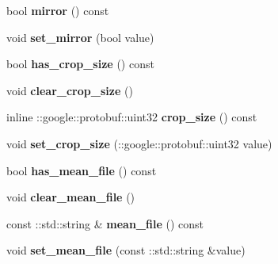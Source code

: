 \begin{DoxyCompactItemize}
bool {\bfseries mirror} () const
\item 
\mbox{\label{classcaffe_1_1_transformation_parameter_a0e266ff7468b2b0ba4c8918617aa4df3}} 
void {\bfseries set\+\_\+mirror} (bool value)
\item 
\mbox{\label{classcaffe_1_1_transformation_parameter_a4119a83b2ae58b89b0b64df912d06693}} 
bool {\bfseries has\+\_\+crop\+\_\+size} () const
\item 
\mbox{\label{classcaffe_1_1_transformation_parameter_a00bbae6421b94a8da3ab51d805ad36c5}} 
void {\bfseries clear\+\_\+crop\+\_\+size} ()
\item 
\mbox{\label{classcaffe_1_1_transformation_parameter_a24d1dc64dfd6da37bf683ab305f97014}} 
inline \+::google\+::protobuf\+::uint32 {\bfseries crop\+\_\+size} () const
\item 
\mbox{\label{classcaffe_1_1_transformation_parameter_af0dbaab7996f1942664bad0330931c8c}} 
void {\bfseries set\+\_\+crop\+\_\+size} (\+::google\+::protobuf\+::uint32 value)
\item 
\mbox{\label{classcaffe_1_1_transformation_parameter_a0ee303248135631fcfe282cd45994ae5}} 
bool {\bfseries has\+\_\+mean\+\_\+file} () const
\item 
\mbox{\label{classcaffe_1_1_transformation_parameter_a283a6e3d622d26eb76616ceda14f0be7}} 
void {\bfseries clear\+\_\+mean\+\_\+file} ()
\item 
\mbox{\label{classcaffe_1_1_transformation_parameter_a352ae89a8dc86c0ba75901c9fd1606df}} 
const \+::std\+::string \& {\bfseries mean\+\_\+file} () const
\item 
\mbox{\label{classcaffe_1_1_transformation_parameter_a348f1fad3b2de130acc204d2b01c43f2}} 
void {\bfseries set\+\_\+mean\+\_\+file} (const \+::std\+::string \&value)
\item 

\end{DoxyCompactItemize}
